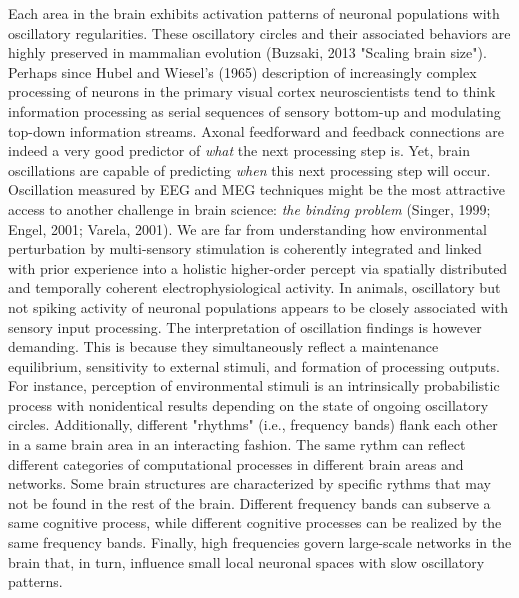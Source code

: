 \documentclass[authoryear,review,3p]{elsarticle}
\begin{document}
Each area in the brain exhibits
activation patterns of neuronal populations with
oscillatory regularities.
These oscillatory circles and their associated behaviors are
highly preserved in mammalian evolution
(Buzsaki, 2013 "Scaling brain size").
%
Perhaps since Hubel and Wiesel's (1965) description of increasingly
complex processing of neurons in the primary visual cortex
neuroscientists tend to think information processing as
serial sequences of sensory bottom-up and
modulating top-down information streams.
Axonal feedforward and feedback connections
are indeed a very good predictor of \textit{what} the next processing step is.
Yet, brain oscillations are capable of predicting \textit{when}
this next processing step will occur.
%
Oscillation measured by EEG and MEG techniques might be the most
attractive access to another challenge in brain science:
\textit{the binding problem} (Singer, 1999; Engel, 2001; Varela, 2001).
We are far from understanding how
environmental perturbation by multi-sensory stimulation
is coherently integrated and linked with prior experience into
a holistic higher-order percept via
spatially distributed and temporally coherent electrophysiological activity.
%
In animals, oscillatory but not spiking activity of neuronal populations appears
to be closely associated with sensory input processing.
The interpretation of oscillation findings is however demanding.
This is because they
simultaneously reflect
a maintenance equilibrium, sensitivity to external stimuli, and
formation of processing outputs.
For instance,
perception of environmental stimuli
is an intrinsically probabilistic process with nonidentical
results depending on the state of ongoing oscillatory circles.
Additionally,
different "rhythms" (i.e., frequency bands) flank each other
in a same brain area in an interacting fashion.
The same rythm can reflect different categories of computational processes
in different brain areas and networks. Some brain structures are
characterized by specific rythms that may not be found in the rest
of the brain.
Different frequency bands can subserve a same cognitive process, while
different cognitive processes can be realized by the same frequency bands.
%
Finally,
high frequencies govern large-scale networks in the brain that, in turn,
influence small local neuronal spaces with slow oscillatory patterns.
\end{document}
